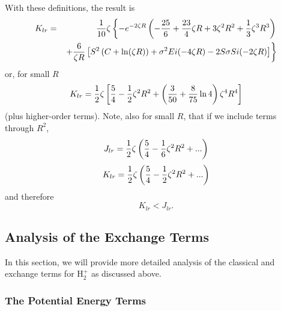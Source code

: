 With these definitions, the result is
\begin{eqnarray*}
K_{lr} &= & {1 \over 10} \zeta \left\{ -e^{-2 \zeta R} \left( - {25 
\over 6} + {23 \over 4} \zeta R + 3 \zeta^2 R^2 + {1 \over 3} \zeta^3 
R^3 \right)\right.\cr
&& \left. + {6 \over \zeta R} \left[ S^2 \left( C + \ln ( \zeta R ) 
\right) + \sigma^2 Ei (-4 \zeta R) - 2S \sigma Si (-2 \zeta 
R)\right]\right\}\cr
\end{eqnarray*}
or, for small $R$
\begin{equation}
K_{lr} = {1 \over 2} \zeta \left[ {5 \over 4} - {1 \over 2} \zeta^2 
R^2 + \left( {3 \over 50} + {8 \over 75} \ln4 \right) \zeta^4 R^4 
\right]
\end{equation}
(plus higher-order terms).  Note, also for small $R$, that if we
include terms through $R^2$,
\begin{equation}
J_{lr} = {1 \over 2} \zeta \left( {5 \over 4} - {1 \over 6} \zeta^2 
R^2 + ... \right)
\end{equation}
\begin{equation}
K_{lr} = {1 \over 2} \zeta \left( {5 \over 4} - {1 \over 2} \zeta^2 
R^2 + ... \right)
\end{equation}
and therefore
\begin{equation}
K_{lr} < J_{lr} .
\end{equation}

\subsection{Analysis of the Exchange Terms}

In this section, we will provide more detailed analysis of the classical and
exchange terms for H$^+_2$ as discussed above.

\subsubsection{The Potential Energy Terms}
    
